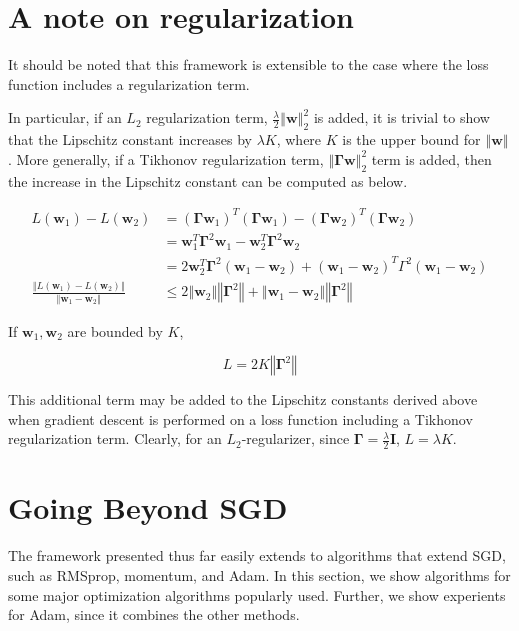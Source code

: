 \documentclass{article}
\begin{document}
\section{A note on regularization} \label{regularization}
It should be noted that this framework is extensible to the case where the loss function includes a regularization term. 

In particular, if an $L_2$ regularization term, $\frac{\lambda}{2}\left\Vert \textbf{w} \right\Vert_2^2$ is added, it is trivial to show that the Lipschitz constant increases by $\lambda K$, where $K$ is the upper bound for $\left\Vert \textbf{w} \right\Vert$. More generally, if a Tikhonov regularization term, $\left\Vert \boldsymbol\Gamma \textbf{w} \right\Vert_2^2$ term is added, then the increase in the Lipschitz constant can be computed as below.

\[
    \begin{aligned}
        L(\textbf{w}_1) - L(\textbf{w}_2) &= (\boldsymbol\Gamma \textbf{w}_1)^T (\boldsymbol\Gamma \textbf{w}_1) - (\boldsymbol\Gamma \textbf{w}_2)^T (\boldsymbol\Gamma \textbf{w}_2) \\
        &= \textbf{w}_1^T \boldsymbol\Gamma^2 \textbf{w}_1 - \textbf{w}_2^T \boldsymbol\Gamma^2 \textbf{w}_2 \\
        &= 2\textbf{w}_2^T \boldsymbol\Gamma^2 (\textbf{w}_1 - \textbf{w}_2) + (\textbf{w}_1-\textbf{w}_2)^T \Gamma^2 (\textbf{w}_1-\textbf{w}_2) \\
        \frac{\left\Vert L(\textbf{w}_1) - L(\textbf{w}_2) \right\Vert}{\left\Vert \textbf{w}_1-\textbf{w}_2 \right\Vert} & \leq 2 \left\Vert \textbf{w}_2 \right\Vert \left\Vert \boldsymbol\Gamma^2 \right\Vert + \left\Vert \textbf{w}_1-\textbf{w}_2 \right\Vert \left\Vert \boldsymbol\Gamma^2 \right\Vert 
    \end{aligned}
\]

If $\textbf{w}_1, \textbf{w}_2$ are bounded by $K$, 

\[
    \boxed{
        L = 2K \left\Vert \boldsymbol\Gamma^2 \right\Vert
    }
\]

This additional term may be added to the Lipschitz constants derived above when gradient descent is performed on a loss function including a Tikhonov regularization term. Clearly, for an $L_2$-regularizer, since $\boldsymbol\Gamma = \frac{\lambda}{2}\textbf{I}$, $L = \lambda K$.

\section{Going Beyond SGD}
The framework presented thus far easily extends to algorithms that extend SGD, such as RMSprop, momentum, and Adam. In this section, we show algorithms for some major optimization algorithms popularly used. Further, we show experients for Adam, since it combines the other methods.
\end{document}
